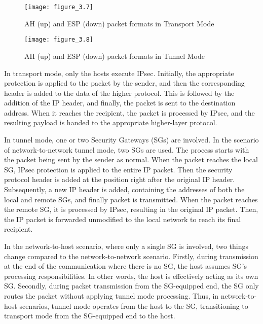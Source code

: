 \begin{figure}[H]
\centering
\texttt{[image: figure\_3.7]}\\
\caption{ AH (up) and ESP (down) packet formats in Transport Mode}
\label{fig:figure3.7}
\end{figure}

\begin{figure}[H]
\centering
\texttt{[image: figure\_3.8]}\\
\caption{ AH (up) and ESP (down) packet formats in Tunnel Mode}
\label{fig:figure3.8}
\end{figure}


In transport mode, only the hosts execute IPsec. Initially, the appropriate protection is applied to the packet by the sender, and then the corresponding header is added to the data of the higher protocol. This is followed by the addition of the IP header, and finally, the packet is sent to the destination address. When it reaches the recipient, the packet is processed by IPsec, and the resulting payload is handed to the appropriate higher-layer protocol.

In tunnel mode, one or two Security Gateways (SGs) are involved. In the scenario of network-to-network tunnel mode, two SGs are used. The process starts with the packet being sent by the sender as normal. When the packet reaches the local SG, IPsec protection is applied to the entire IP packet. Then the security protocol header is added at the position right after the original IP header. Subsequently, a new IP header is added, containing the addresses of both the local and remote SGs, and finally packet is transmitted. When the packet reaches the remote SG, it is processed by IPsec, resulting in the original IP packet. Then, the IP packet is forwarded unmodified to the local network to reach its final recipient.

In the network-to-host scenario, where only a single SG is involved, two things change compared to the network-to-network scenario. Firstly, during transmission at the end of the communication where there is no SG, the host assumes SG's processing responsibilities. In other words, the host is effectively acting as its own SG. Secondly, during packet transmission from the SG-equipped end, the SG only routes the packet without applying tunnel mode processing. Thus, in network-to-host scenarios, tunnel mode operates from the host to the SG, transitioning to transport mode from the SG-equipped end to the host.


